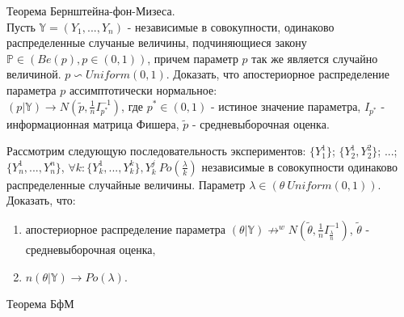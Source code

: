 \begin{problem} Теорема Бернштейна-фон-Мизеса.\\
Пусть $\mathbb{Y} = (Y_1, ..., Y_n)$ - независимые в совокупности, одинаково распределенные случаные величины, подчиняющиеся закону $\mathbb{P} \in (Be(p), p \in (0, 1))$, причем параметр $p$ так же является случайно величиной. $p \backsim Uniform(0,1)$. Доказать, что апостериорное распределение параметра $p$ ассимптотически нормальное:\\
$(p|\mathbb{Y}) \rightarrow N(\tilde{p}, \frac{1}{n}I_{p^*}^{-1})$, где $p^* \in (0, 1)$ - истиное значение параметра, $I_{p^*}$ - информационная матрица Фишера, $\tilde{p}$ - средневыборочная оценка.
\begin{ordre}
\end{ordre}
\end{problem}

\begin{problem}
Рассмотрим следующую последовательность экспериментов:
$\{Y_1^1\}$; $\{Y_2^1, Y_2^2\}$; ...;$\{Y_n^1,..., Y_n^n\}$, $\forall k: \{Y_k^1,...,Y_k^k\}, Y_k^j ~ Po(\frac{\lambda}{k})$ независимые в совокупности одинаково распределенные случайные величины. Параметр $\lambda \in (\theta ~ Uniform(0, 1))$. Доказать, что:
\begin{enumerate}
\item апостериорное распределение параметра $(\theta|\mathbb{Y}) \not\rightarrow^{w} N(\tilde{\theta},\frac{1}{n}I_{\frac{\lambda}{n}}^{-1} )$, $\tilde{\theta}$ - средневыборочная оценка,
\item $n(\theta|\mathbb{Y}) \rightarrow Po(\lambda)$.
\end{enumerate}
\end{problem}
\begin{remark} Теорема БфМ 
\end{remark}

